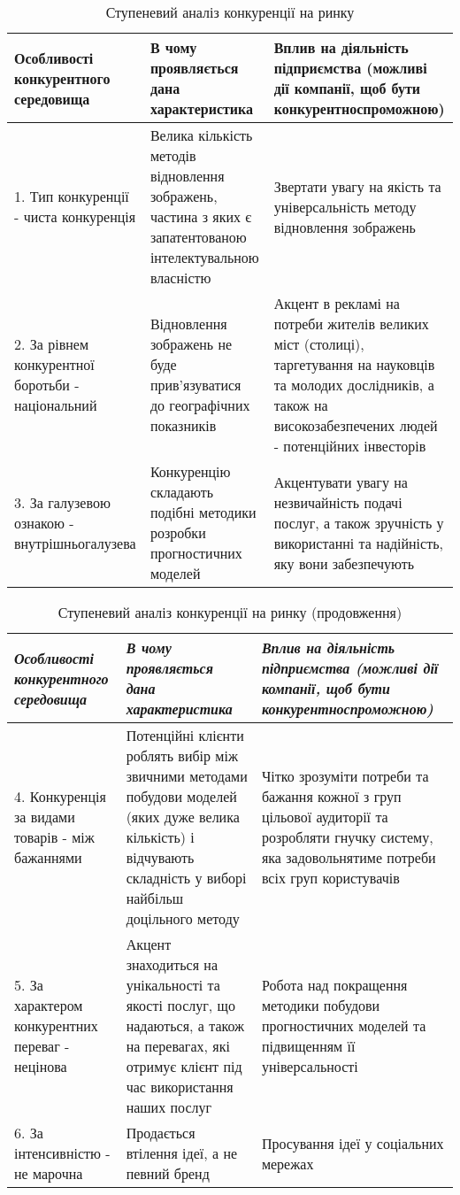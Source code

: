 \begin{table}[H]
\fontsize{12pt}{12pt}\selectfont
	\begin{tabularx}{\textwidth}{|X|X|X|}
    \hline
    Особливості конкурентного середовища & В чому проявляється дана характеристика & Вплив на діяльність підприємства (можливі дії компанії, щоб бути конкурентноспроможною) \\ \hline
    1. Тип конкуренції - чиста конкуренція & Велика кількість методів відновлення зображень, частина з яких є запатентованою інтелектувальною власністю & Звертати увагу на якість та універсальність методу відновлення зображень \\ \hline 
    2. За рівнем конкурентної боротьби - національний & Відновлення зображень не буде прив'язуватися до географічних показників & Акцент в рекламі на потреби жителів великих міст (столиці), таргетування на науковців та молодих дослідників, а також на високозабезпечених людей - потенційних інвесторів \\ \hline 
    3. За галузевою ознакою - внутрішньогалузева & Конкуренцію складають подібні методики розробки прогностичних моделей & Акцентувати увагу на незвичайність подачі послуг, а також зручність у використанні та надійність, яку вони забезпечують \\
    \hline
    \end{tabularx}
\caption{Ступеневий аналіз конкуренції на ринку} \label{tab:stab_4_1}
\end{table}

\begin{table}[H]
\fontsize{12pt}{12pt}\selectfont
    \begin{tabularx}{\textwidth}{|X|X|X|}
    \hline
    \textit{Особливості конкурентного середовища} & \textit{В чому проявляється дана характеристика} & \textit{Вплив на діяльність підприємства (можливі дії компанії, щоб бути конкурентноспроможною)} \\ \hline
    4. Конкуренція за видами товарів - між бажаннями & Потенційні клієнти роблять вибір між звичними методами побудови моделей (яких дуже велика кількість) і відчувають складність у виборі найбільш доцільного методу & Чітко зрозуміти потреби та бажання кожної з груп цільової аудиторії та розробляти гнучку систему, яка задовольнятиме потреби всіх груп користувачів \\ \hline 
    5. За характером конкурентних переваг - нецінова & Акцент знаходиться на унікальності та якості послуг, що надаються, а також на перевагах, які отримує клієнт під час використання наших послуг & Робота над покращення методики побудови прогностичних моделей та підвищенням її універсальності \\ \hline 
    6. За інтенсивністю - не марочна & Продається втілення ідеї, а не певний бренд & Просування ідеї у соціальних мережах \\
    \hline
    \end{tabularx}
\caption{Ступеневий аналіз конкуренції на ринку (продовження)} \label{tab:stab_4_2}
\end{table}

